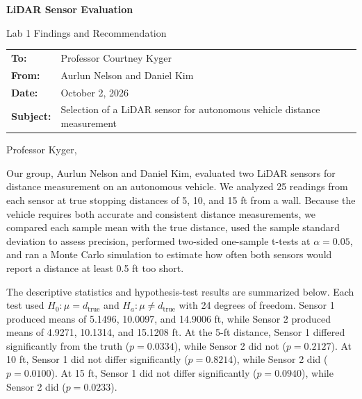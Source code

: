\documentclass[10pt]{article}
\newcommand{\partnername}{Daniel Kim}
\begin{document}
{\LARGE\bfseries LiDAR Sensor Evaluation}\par
\vspace{0.25em}
{\color{vtmaroon}\large Lab 1 Findings and Recommendation}\par

\vspace{0.85em}
\begin{tabular}{@{}>{\bfseries}p{0.75in}p{5.9in}@{}}
To: & Professor Courtney Kyger \\
From: & Aurlun Nelson and \partnername \\
Date: & October 2, 2026 \\
Subject: & Selection of a LiDAR sensor for autonomous vehicle distance measurement \\
\end{tabular}

\vspace{0.75em}
Professor Kyger,

Our group, Aurlun Nelson and \partnername, evaluated two LiDAR sensors for distance measurement on an autonomous vehicle. We analyzed 25 readings from each sensor at true stopping distances of 5, 10, and 15 ft from a wall. Because the vehicle requires both accurate and consistent distance measurements, we compared each sample mean with the true distance, used the sample standard deviation to assess precision, performed two-sided one-sample t-tests at $\alpha=0.05$, and ran a Monte Carlo simulation to estimate how often both sensors would report a distance at least 0.5 ft too short.

The descriptive statistics and hypothesis-test results are summarized below. Each test used $H_0:\mu=d_{\mathrm{true}}$ and $H_a:\mu\neq d_{\mathrm{true}}$ with 24 degrees of freedom. Sensor 1 produced means of 5.1496, 10.0097, and 14.9006 ft, while Sensor 2 produced means of 4.9271, 10.1314, and 15.1208 ft. At the 5-ft distance, Sensor 1 differed significantly from the truth ($p=0.0334$), while Sensor 2 did not ($p=0.2127$). At 10 ft, Sensor 1 did not differ significantly ($p=0.8214$), while Sensor 2 did ($p=0.0100$). At 15 ft, Sensor 1 did not differ significantly ($p=0.0940$), while Sensor 2 did ($p=0.0233$).
\end{document}

